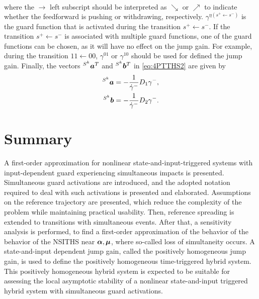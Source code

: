 \documentclass[../DC2017114Bouma.tex]{subfiles}
\begin{document}
\begin{mydef}[PTTHS]
\begin{align*}
\end{align*}
where the $\rightarrow$ left subscript should be interpreted as $\searrow$ or $\nearrow$ to indicate whether the feedforward is pushing or withdrawing, respectively. $\gamma^{\eta(s^+\leftarrow s^-)}$ is the guard function that is activated during the transition $s^+\leftarrow s^-$. If the transition $s^+\leftarrow s^-$ is associated with multiple guard functions, one of the guard functions can be chosen, as it will have no effect on the jump gain. For example, during the transition $11\leftarrow 00$, $\gamma^{01}$ or $\gamma^{10}$ should be used for defined the jump gain. Finally, the vectors $\hspace{0cm}^{S^k}{\boldsymbol{a}}^T$ and $\hspace{0cm}^{S^k}{\boldsymbol{b}}^T$ in \eqref{eq:4PTTHS2} are given by
\begin{align*}
\hspace{0cm}^{S^k}{\boldsymbol{a}} &= -\frac{1}{\dot{\gamma}^{-}}D_1\gamma^{-},\\
\hspace{0cm}^{S^k}{\boldsymbol{b}} &= -\frac{1}{\dot{\gamma}^{-}}D_2\gamma^{-}.
\end{align*}
\end{mydef}

%
%
%
%
%
%

\section{Summary}
A first-order approximation for nonlinear state-and-input-triggered systems with input-dependent guard experiencing simultaneous impacts is presented. Simultaneous guard activations are introduced, and the adopted notation required to deal with such activations is presented and elaborated. Assumptions on the reference trajectory are presented, which reduce the complexity of the problem while maintaining practical usability. Then, reference spreading is extended to transitions with simultaneous events. After that, a sensitivity analysis is performed, to find a first-order approximation of the behavior of the behavior of the NSITHS near $\boldsymbol{\alpha},\boldsymbol{\mu}$, where so-called loss of simultaneity occurs. A state-and-input dependent jump gain, called the positively homogeneous jump gain, is used to define the positively homogeneous time-triggered hybrid system. This positively homogeneous hybrid system is expected to be suitable for assessing the local asymptotic stability of a nonlinear state-and-input triggered hybrid system with simultaneous guard activations.
\end{document}

